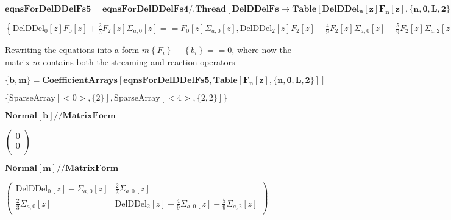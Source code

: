 \documentclass{article}
\begin{document}
\begin{doublespace}
\noindent\(\pmb{\text{eqnsForDelDDelFs5}=\text{eqnsForDelDDelFs4}\text{/.}\text{Thread}\left[\text{DelDDelFs}\to \text{Table}\left[\text{DelDDel}_n[z]F_n[z],\{n,0,L,2\}\right]\right]}\)
\end{doublespace}

\begin{doublespace}
\noindent\(\left\{\text{DelDDel}_0[z] F_0[z]+\frac{2}{3} F_2[z] \Sigma _{a,0}[z]==F_0[z] \Sigma _{a,0}[z],\text{DelDDel}_2[z] F_2[z]-\frac{4}{9}
F_2[z] \Sigma _{a,0}[z]-\frac{5}{9} F_2[z] \Sigma _{a,2}[z]==-\frac{2}{3} F_0[z] \Sigma _{a,0}[z]\right\}\)
\end{doublespace}

Rewriting the equations into a form { }\(m \left\{F_i\right\}-\left\{b_i\right\}==0\), { }where now the matrix \(m\) contains both the streaming
and reaction operators  

\begin{doublespace}
\noindent\(\pmb{\{b,m\}=\text{CoefficientArrays}\left[\text{eqnsForDelDDelFs5},\text{Table}\left[F_n[z],\{n,0,L,2\}\right]\right]}\)
\end{doublespace}

\begin{doublespace}
\noindent\(\{\text{SparseArray}[<0>,\{2\}],\text{SparseArray}[<4>,\{2,2\}]\}\)
\end{doublespace}

\begin{doublespace}
\noindent\(\pmb{\text{Normal}[b]\text{//}\text{MatrixForm}}\)
\end{doublespace}

\begin{doublespace}
\noindent\(\left(
\begin{array}{c}
 0 \\
 0 \\
\end{array}
\right)\)
\end{doublespace}

\begin{doublespace}
\noindent\(\pmb{\text{Normal}[m]\text{//}\text{MatrixForm}}\)
\end{doublespace}

\begin{doublespace}
\noindent\(\left(
\begin{array}{cc}
 \text{DelDDel}_0[z]-\Sigma _{a,0}[z] & \frac{2}{3} \Sigma _{a,0}[z] \\
 \frac{2}{3} \Sigma _{a,0}[z] & \text{DelDDel}_2[z]-\frac{4}{9} \Sigma _{a,0}[z]-\frac{5}{9} \Sigma _{a,2}[z] \\
\end{array}
\right)\)
\end{doublespace}
\end{document}
